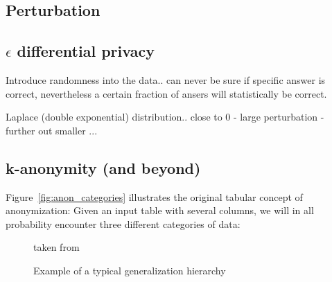 \documentclass{llncs}
\begin{document}
\subsection{Perturbation}
\label{ssect:perturbation}

\subsection{$\epsilon$  differential privacy}
\label{ssect:eps_priv}

Introduce randomness into the data.. can never be sure if specific answer is correct, nevertheless a certain fraction of ansers will statistically be correct.

Laplace (double exponential) distribution.. close to 0 - large perturbation - further out smaller ...

\subsection{k-anonymity (and beyond)}
\label{ssect:k_anon}

Figure~\ref{fig:anon_categories} illustrates the original tabular concept of anonymization: Given an input table with several columns, we will in all probability encounter three different categories of data:


\begin{figure}[!t]
	\begin{center}
		\caption{Example of a typical generalization hierarchy}
		\label{fig:gen_hierarchy}
		\small
		taken from \cite{aggarwal2005approximation}
	\end{center}
\end{figure}
\end{document}
